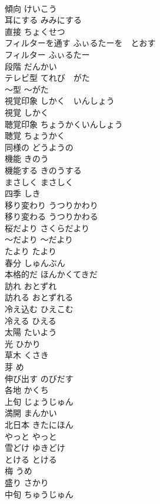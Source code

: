 \documentclass[8pt]{extreport}
\begin{document}
\begin{CJK}{UTF8}{min}
\\	傾向	けいこう	
\\	耳にする	みみにする	
\\	直接	ちょくせつ	
\\	フィルターを通す	ふぃるたーを　とおす	
\\	フィルター	ふぃるたー	
\\	段階	だんかい	
\\	テレビ型	てれび　がた	
\\	〜型	〜がた	
\\	視覚印象	しかく　いんしょう	
\\	視覚	しかく	
\\	聴覚印象	ちょうかくいんしょう	
\\	聴覚	ちょうかく	
\\	同様の	どうようの	
\\	機能	きのう	
\\	機能する	きのうする	
\\	まさしく	まさしく	
\\	四季	しき	
\\	移り変わり	うつりかわり	
\\	移り変わる	うつりかわる	
\\	桜だより	さくらだより	
\\	〜だより	〜だより	
\\	たより	たより	
\\	春分	しゅんぶん	
\\	本格的だ	ほんかくてきだ	
\\	訪れ	おとずれ	
\\	訪れる	おとずれる	
\\	冷え込む	ひえこむ	
\\	冷える	ひえる	
\\	太陽	たいよう	
\\	光	ひかり	
\\	草木	くさき	
\\	芽	め	
\\	伸び出す	のびだす	
\\	各地	かくち	
\\	上旬	じょうじゅん	
\\	満開	まんかい	
\\	北日本	きたにほん	
\\	やっと	やっと	
\\	雪どけ	ゆきどけ	
\\	とける	とける	
\\	梅	うめ	
\\	盛り	さかり	
\\	中旬	ちゅうじゅん	

\end{CJK}
\end{document}
